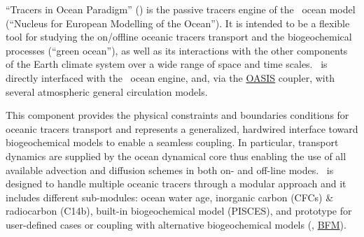 
``Tracers in Ocean Paradigm'' (\TOP) is the passive tracers engine of
the \NEMO\ ocean model (``Nucleus for European Modelling of the Ocean'').
It is intended to be a flexible tool for studying the on/offline oceanic tracers transport and
the biogeochemical processes (``green ocean''),
as well as its interactions with the other components of the Earth climate system over
a wide range of space and time scales.
\TOP\ is directly interfaced with the \NEMO\ ocean engine, and,
via the \href{http://portal.enes.org/oasis}{OASIS} coupler,
with several atmospheric general circulation models.

This component provides the physical constraints and boundaries conditions for
oceanic tracers transport and represents a generalized, hardwired interface toward
biogeochemical models to enable a seamless coupling.
In particular, transport dynamics are supplied by the ocean dynamical core thus
enabling the use of all available advection and diffusion schemes in both on- and off-line modes.
\TOP\ is designed to handle multiple oceanic tracers through a modular approach and
it includes different sub-modules: ocean water age, inorganic carbon (CFCs) \& radiocarbon (C14b),
built-in biogeochemical model (PISCES), and prototype for user-defined cases or
coupling with alternative biogeochemical models (\eg, \href{http://www.bfm-community.eu}{BFM}).
